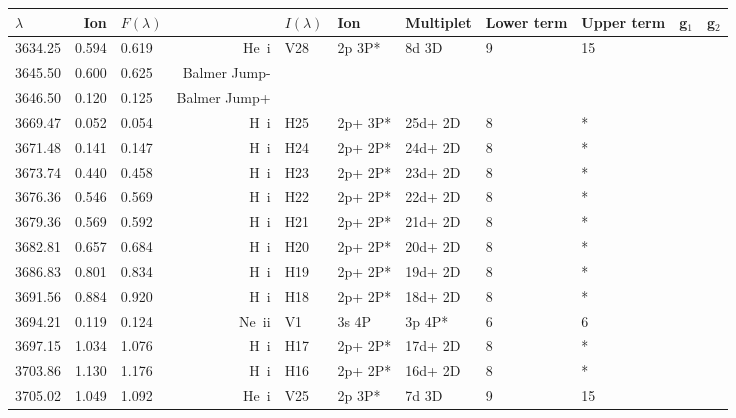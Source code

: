  \begin{longtable}{lrlrlllllll}
 \hline
 $ \lambda $ & Ion & $F \left( \lambda \right) $ && $I \left( \lambda \right) $ & Ion & Multiplet & Lower term & Upper term & g$_1$ & g$_2$ \\
 \hline
 3634.25 &   0.594 &   0.619 &  He~{\sc i}      &  V28       &  2p 3P*    &  8d 3D     &          9 &       15    \\
 3645.50 &   0.600 &   0.625 & Balmer Jump-                                                                       \\
 3646.50 &   0.120 &   0.125 & Balmer Jump+                                                                       \\
 3669.47 &   0.052 &   0.054 &  H~{\sc i}       &  H25       &  2p+ 3P*   &  25d+ 2D   &          8 &        *    \\
 3671.48 &   0.141 &   0.147 &  H~{\sc i}       &  H24       &  2p+ 2P*   &  24d+ 2D   &          8 &        *    \\
 3673.74 &   0.440 &   0.458 &  H~{\sc i}       &  H23       &  2p+ 2P*   &  23d+ 2D   &          8 &        *    \\
 3676.36 &   0.546 &   0.569 &  H~{\sc i}       &  H22       &  2p+ 2P*   &  22d+ 2D   &          8 &        *    \\
 3679.36 &   0.569 &   0.592 &  H~{\sc i}       &  H21       &  2p+ 2P*   &  21d+ 2D   &          8 &        *    \\
 3682.81 &   0.657 &   0.684 &  H~{\sc i}       &  H20       &  2p+ 2P*   &  20d+ 2D   &          8 &        *    \\
 3686.83 &   0.801 &   0.834 &  H~{\sc i}       &  H19       &  2p+ 2P*   &  19d+ 2D   &          8 &        *    \\
 3691.56 &   0.884 &   0.920 &  H~{\sc i}       &  H18       &  2p+ 2P*   &  18d+ 2D   &          8 &        *    \\
 3694.21 &   0.119 &   0.124 &  Ne~{\sc ii}     &  V1        &  3s 4P     &  3p 4P*    &          6 &        6    \\
 3697.15 &   1.034 &   1.076 &  H~{\sc i}       &  H17       &  2p+ 2P*   &  17d+ 2D   &          8 &        *    \\
 3703.86 &   1.130 &   1.176 &  H~{\sc i}       &  H16       &  2p+ 2P*   &  16d+ 2D   &          8 &        *    \\
 3705.02 &   1.049 &   1.092 &  He~{\sc i}      &  V25       &  2p 3P*    &  7d 3D     &          9 &       15    \\

\end{longtable}
